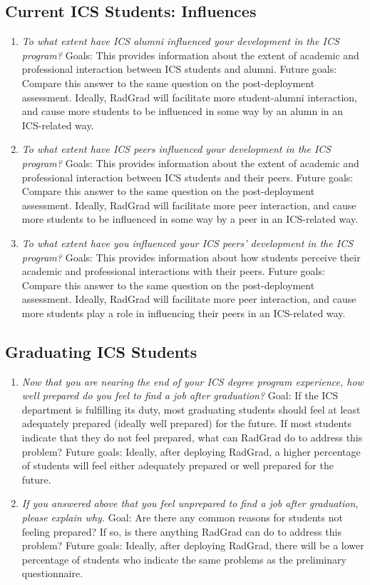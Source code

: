 \subsection{Current ICS Students: Influences}
\begin{enumerate}
\item \textit{To what extent have ICS alumni influenced your development in the ICS program?}
Goals: This provides information about the extent of academic and professional interaction between ICS students and alumni.
Future goals: Compare this answer to the same question on the post-deployment assessment. Ideally, RadGrad will facilitate more student-alumni interaction, and cause more students to be influenced in some way by an alumn in an ICS-related way.
\item \textit{To what extent have ICS peers influenced your development in the ICS program?}
Goals: This provides information about the extent of academic and professional interaction between ICS students and their peers.
Future goals: Compare this answer to the same question on the post-deployment assessment. Ideally, RadGrad will facilitate more peer interaction, and cause more students to be influenced in some way by a peer in an ICS-related way.
\item \textit{To what extent have you influenced your ICS peers’ development in the ICS program?}
Goals: This provides information about how students perceive their academic and professional interactions with their peers.
Future goals: Compare this answer to the same question on the post-deployment assessment. Ideally, RadGrad will facilitate more peer interaction, and cause more students play a role in influencing their peers in an ICS-related way.
\end{enumerate}

\subsection{Graduating ICS Students}
\begin{enumerate}
\item \textit{Now that you are nearing the end of your ICS degree program experience, how well prepared do you feel to find a job after graduation?}
Goal: If the ICS department is fulfilling its duty, most graduating students should feel at least adequately prepared (ideally well prepared) for the future. If most students indicate that they do not feel prepared, what can RadGrad do to address this problem? 
Future goals: Ideally, after deploying RadGrad, a higher percentage of students will feel either adequately prepared or well prepared for the future.
\item \textit{If you answered above that you feel unprepared to find a job after graduation, please explain why. }
Goal: Are there any common reasons for students not feeling prepared? If so, is there anything RadGrad can do to address this problem? 
Future goals: Ideally, after deploying RadGrad, there will be a lower percentage of students who indicate the same problems as the preliminary questionnaire. 
\end{enumerate}


